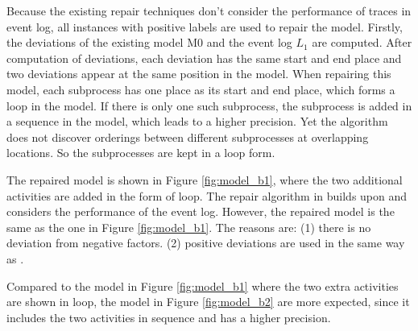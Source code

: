 Because the existing repair techniques \cite{fahland2015model} don't consider the performance of traces in event log, all instances with positive labels are used to repair the model. Firstly, the deviations of the existing model M0 and the event log $L_1$ are computed. After computation of deviations, each deviation has the same start and end place and two deviations appear at the same position in the model. When repairing this model, each subprocess has one place as its start and end place, which forms a loop in the model. If there is only one such subprocess, the subprocess is added in a sequence in the model, which leads to a higher precision. Yet the algorithm does not discover orderings between different subprocesses at overlapping locations. So the subprocesses are kept in a loop form. 

The repaired model is shown in Figure \ref{fig:model_b1}, where the two additional activities are added in the form of loop. The repair algorithm in \cite{dees2017enhancing} builds upon \cite{fahland2015model} and considers the performance of the event log. However, the repaired model is the same as the one in Figure \ref{fig:model_b1}. The reasons are: (1) there is no deviation from negative factors. (2) positive deviations are used in the same way as \cite{fahland2015model}. 

Compared to the model in Figure \ref{fig:model_b1} where the two extra activities are shown in loop, the model in Figure \ref{fig:model_b2} are more expected, since it includes the two activities in sequence and has a higher precision.

